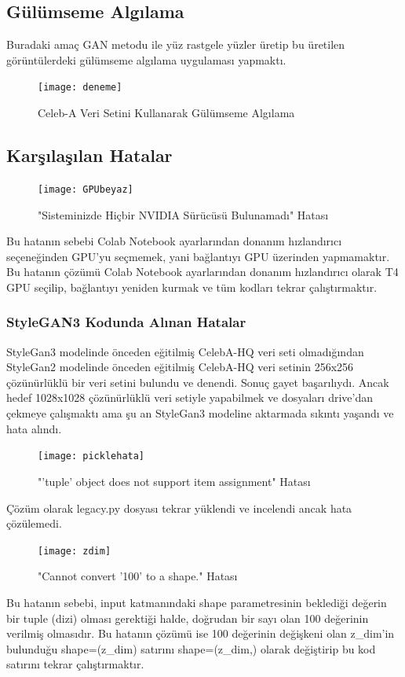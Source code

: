 \documentclass[12pt, a4paper]{article}
\begin{document}
	\subsection{Gülümseme Algılama}
	Buradaki amaç GAN metodu ile yüz rastgele yüzler üretip bu üretilen görüntülerdeki gülümseme algılama uygulaması yapmaktı. 
	
	\begin{figure}[h]
		\centering
		\texttt{[image: deneme]}
		\label{deneme}
		\caption{Celeb-A Veri Setini Kullanarak Gülümseme Algılama\cite{Smile-Detection}}
	\end{figure}	
	\FloatBarrier
	\clearpage
	\subsection{Karşılaşılan Hatalar}
	
	\begin{figure}[h]
		\centering
		\texttt{[image: GPUbeyaz]}
		\label{GPUbeyaz}
		\caption{"Sisteminizde Hiçbir NVIDIA Sürücüsü Bulunamadı" Hatası}
	\end{figure}
	\FloatBarrier
	Bu hatanın sebebi Colab Notebook ayarlarından donanım hızlandırıcı seçeneğinden GPU'yu seçmemek, yani bağlantıyı GPU üzerinden yapmamaktır. Bu hatanın çözümü Colab Notebook ayarlarından donanım hızlandırıcı olarak T4 GPU seçilip, bağlantıyı yeniden kurmak ve tüm kodları tekrar çalıştırmaktır.
	\subsubsection{StyleGAN3 Kodunda Alınan Hatalar}
	StyleGan3 modelinde önceden eğitilmiş\cite{StyleGAN3-2024-04-16} CelebA-HQ veri seti olmadığından StyleGan2 modelinde önceden eğitilmiş\cite{StyleGAN2-2024-04-14} CelebA-HQ veri setinin 256x256 çözünürlüklü bir veri setini bulundu ve denendi. Sonuç gayet başarılıydı. Ancak hedef 1028x1028 çözünürlüklü veri setiyle yapabilmek ve dosyaları drive'dan çekmeye çalışmaktı ama şu an StyleGan3 modeline aktarmada sıkıntı yaşandı ve hata alındı.
	
	\begin{figure}[h]
		\centering
		\texttt{[image: picklehata]}
		\label{picklehata}
		\caption{"'tuple' object does not support item assignment" Hatası}
	\end{figure}
	\FloatBarrier
	Çözüm olarak legacy.py dosyası tekrar yüklendi ve incelendi ancak hata çözülemedi. 
	
	\begin{figure}[ht]
		\centering
		\texttt{[image: zdim]}
		\label{zdim}
		\caption{"Cannot convert '100' to a shape." Hatası}
	\end{figure}
	\FloatBarrier
	Bu hatanın sebebi, input katmanındaki shape parametresinin beklediği değerin bir tuple (dizi) olması gerektiği halde, doğrudan bir sayı olan 100 değerinin verilmiş olmasıdır.
	Bu hatanın çözümü ise 100 değerinin değişkeni olan z\_dim'in bulunduğu shape=(z\_dim) satırını shape=(z\_dim,) olarak değiştirip bu kod satırını tekrar çalıştırmaktır.
	
\end{document}
